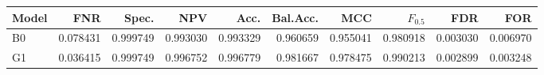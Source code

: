 \begin{tabular}{lrrrrrrrrr}
\toprule
Model & FNR & Spec. & NPV & Acc. & Bal.Acc. & MCC & $F_{0.5}$ & FDR & FOR \\
\midrule
B0 & 0.078431 & 0.999749 & 0.993030 & 0.993329 & 0.960659 & 0.955041 & 0.980918 & 0.003030 & 0.006970 \\
G1 & 0.036415 & 0.999749 & 0.996752 & 0.996779 & 0.981667 & 0.978475 & 0.990213 & 0.002899 & 0.003248 \\
\bottomrule
\end{tabular}

